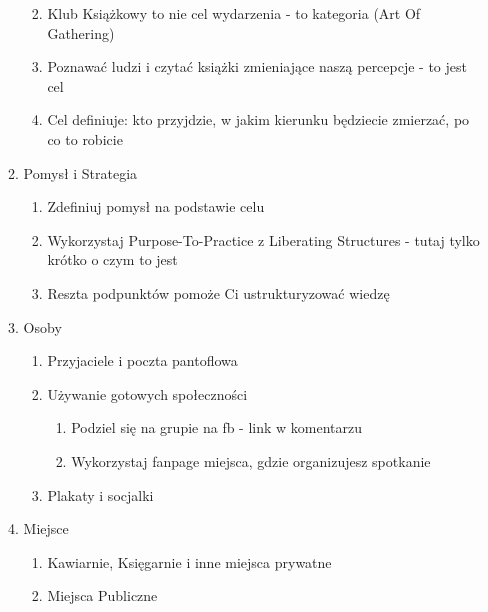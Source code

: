\begin{enumerate}
\begin{enumerate}
    \begin{enumerate}
    \def\labelenumiii{\arabic{enumiii}.}
    \tightlist
    \item
      Klub Książkowy to nie cel wydarzenia - to kategoria (Art Of
      Gathering)
    \item
      Poznawać ludzi i czytać książki zmieniające naszą percepcje - to
      jest cel
    \item
      Cel definiuje: kto przyjdzie, w jakim kierunku będziecie zmierzać,
      po co to robicie
    \end{enumerate}
  \item
    Pomysł i Strategia

    \begin{enumerate}
    \def\labelenumiii{\arabic{enumiii}.}
    \tightlist
    \item
      Zdefiniuj pomysł na podstawie celu
    \item
      Wykorzystaj Purpose-To-Practice z Liberating Structures - tutaj
      tylko krótko o czym to jest
    \item
      Reszta podpunktów pomoże Ci ustrukturyzować wiedzę
    \end{enumerate}
  \item
    Osoby

    \begin{enumerate}
    \def\labelenumiii{\arabic{enumiii}.}
    \tightlist
    \item
      Przyjaciele i poczta pantoflowa
    \item
      Używanie gotowych społeczności

      \begin{enumerate}
      \def\labelenumiv{\arabic{enumiv}.}
      \tightlist
      \item
        Podziel się na grupie na fb - link w komentarzu
      \item
        Wykorzystaj fanpage miejsca, gdzie organizujesz spotkanie
      \end{enumerate}
    \item
      Plakaty i socjalki
    \end{enumerate}
  \item
    Miejsce

    \begin{enumerate}
    \def\labelenumiii{\arabic{enumiii}.}
    \tightlist
    \item
      Kawiarnie, Księgarnie i inne miejsca prywatne
    \item
      Miejsca Publiczne


\end{enumerate}
\end{enumerate}
\end{enumerate}
